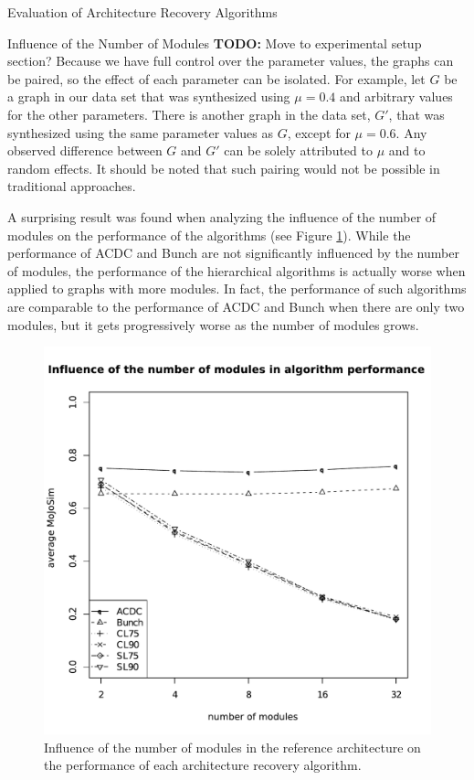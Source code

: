 \documentclass[11pt,twocolumn,a4paper,english]{article}
\newcommand{\TODO}{\textbf{TODO:} }
\begin{document}
\begin{section}{Evaluation of Architecture Recovery Algorithms}
\begin{subsection}{Influence of the Number of Modules}
	\TODO Move to experimental setup section?
	Because we have full control over the parameter values, the graphs can be paired, so the effect of each parameter can be isolated. For example, let $G$ be a graph in our data set that was synthesized using $\mu = 0.4$ and arbitrary values for the other parameters. There is another graph in the data set, $G\prime$, that was synthesized using the same parameter values as $G$, except for $\mu = 0.6$. Any observed difference between $G$ and $G\prime$ can be solely attributed to $\mu$ and to random effects. It should be noted that such pairing would not be possible in traditional approaches.
		
	
	A surprising result was found when analyzing the influence of the number of modules on the performance of the algorithms (see Figure \ref{fig:exp-number-modules}). While the performance of ACDC and Bunch are not significantly influenced by the number of modules, the performance of the hierarchical algorithms is actually worse when applied to graphs with more modules. In fact, the performance of such algorithms are comparable to the performance of ACDC and Bunch when there are only two modules, but it gets  progressively worse as the number of modules grows.
	
	\begin{figure}[htbp]
		\centering
			\includegraphics[scale=0.5]{figures/exp-number-modules}
		\caption{Influence of the number of modules in the reference architecture on the performance of each architecture recovery algorithm.}
		\label{fig:exp-number-modules}
	\end{figure}
	

\end{subsection}
\end{section}
\end{document}
